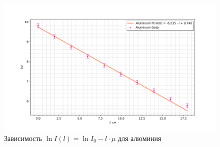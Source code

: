 \documentclass[a4paper]{article}
\begin{document}
\begin{enumerate}
        \begin{figure}[H]
            \begin{center}
            \includegraphics[scale = 0.65]{Al.png}
            \caption{Зависимость $\ln{I}(l) = \ln{I_0} -  l\cdot \mu $ для алюминия}
            \label{Al}
            \end{center}
        \end{figure}


\end{enumerate}
\end{document}
